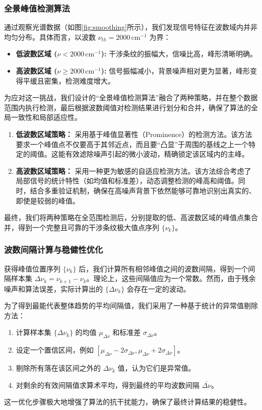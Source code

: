 \documentclass[withoutpreface,bwprint]{cumcmthesis} %
\begin{document}
\subsubsection{全景峰值检测算法}
通过观察光谱数据（如图\ref{fig:smoothing}所示），我们发现信号特征在波数域内并非均匀分布。具体而言，以波数 $\nu_{th} = 2000 \, \text{cm}^{-1}$ 为界：
\begin{itemize}
    \item \textbf{低波数区域 ($\nu < 2000 \, \text{cm}^{-1}$):} 干涉条纹的振幅大，信噪比高，峰形清晰明确。
    \item \textbf{高波数区域 ($\nu \ge 2000 \, \text{cm}^{-1}$):} 信号振幅减小，背景噪声相对更为显著，峰形变得平缓且密集，检测难度增大。
\end{itemize}

为应对这一挑战，我们设计的“全景峰值检测算法”融合了两种策略，并在整个数据范围内执行检测，最后根据波数阈值对检测结果进行划分和合并，确保了算法的全局一致性和局部适应性。
\begin{enumerate}
    \item \textbf{低波数区域策略：} 采用基于峰值显著性（Prominence）的检测方法。该方法要求一个峰值点不仅要高于其邻近点，而且要“凸显”于周围的基线之上一个特定的阈值。这能有效滤除噪声引起的微小波动，精确锁定该区域内的主峰。
    \item \textbf{高波数区域策略：} 采用一种更为敏感的自适应检测方法。该方法综合考虑了局部信号的统计特性（如均值和标准差），动态调整检测的峰高和阈值。同时，结合多重验证机制，确保在高噪声背景下依然能够可靠地识别出真实的、即使是较弱的峰值。
\end{enumerate}
最终，我们将两种策略在全范围检测后，分别提取的低、高波数区域的峰值点集合并，得到一个完整且可靠的干涉条纹极大值点序列 $\{\nu_k\}$。

\subsubsection{波数间隔计算与稳健性优化}
获得峰值位置序列 $\{\nu_k\}$ 后，我们计算所有相邻峰值之间的波数间隔，得到一个间隔样本集 $\Delta\nu_k = \nu_{k+1} - \nu_k$。理论上，这些间隔值应为一个常数。然而，由于残余噪声和算法误差，实际计算出的 $\{\Delta\nu_k\}$ 会存在一定的波动。

为了得到最能代表整体趋势的平均间隔值，我们采用了一种基于统计的异常值剔除方法：
\begin{enumerate}
    \item 计算样本集 $\{\Delta\nu_k\}$ 的均值 $\mu_{\Delta\nu}$ 和标准差 $\sigma_{\Delta\nu}$。
    \item 设定一个置信区间，例如 $[\mu_{\Delta\nu} - 2\sigma_{\Delta\nu}, \mu_{\Delta\nu} + 2\sigma_{\Delta\nu}]$。
    \item 剔除所有落在该区间之外的 $\Delta\nu_k$ 值，认为它们是异常值。
    \item 对剩余的有效间隔值求算术平均，得到最终的平均波数间隔 $\overline{\Delta\nu}$。
\end{enumerate}
这一优化步骤极大地增强了算法的抗干扰能力，确保了最终计算结果的稳健性。
\end{document}
